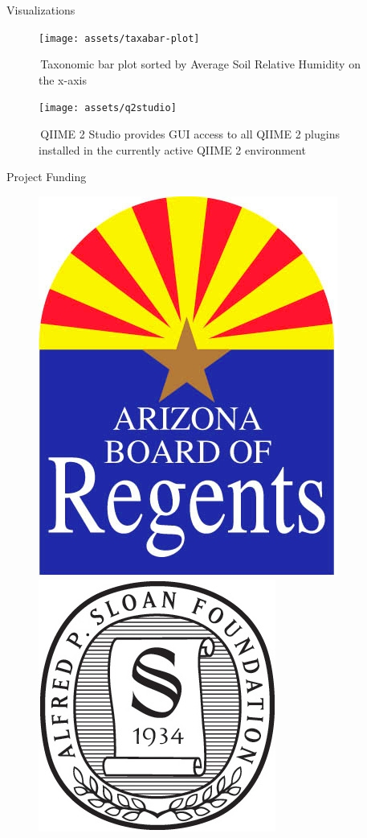 \documentclass[final]{beamer}
\newlength{\colwidth}
\begin{document}
\begin{frame}[t]
\begin{columns}[t]
\begin{column}{\colwidth}
\begin{block}{Visualizations}
    \begin{figure}[tph!]
      {\texttt{[image: assets/taxabar-plot]}}
      \caption{\,Taxonomic bar plot sorted by Average Soil Relative Humidity on the x-axis }
      \label{fig:taxabar-plot}
    \end{figure}

    \begin{figure}[tph!]
      {\texttt{[image: assets/q2studio]}}
      \caption{\,QIIME 2 Studio provides GUI access to all QIIME 2 plugins installed in the currently active QIIME 2 environment}
      \label{fig:q2studio}
    \end{figure}
  \end{block}

  \begin{block}{Project Funding}
      \begin{figure}[!htb]
          \begin{center}
            \includegraphics[width=.35\linewidth]{assets/SponsorLogos/ABOR}
          \end{center}
        \endminipage
        \hskip 2cm
          \begin{center}
            \includegraphics[width=.42\linewidth]{assets/SponsorLogos/APSloanFdn}
          \end{center}
        \endminipage\hfill

\end{figure}
\end{block}
\end{column}
\end{columns}
\end{frame}
\end{document}
